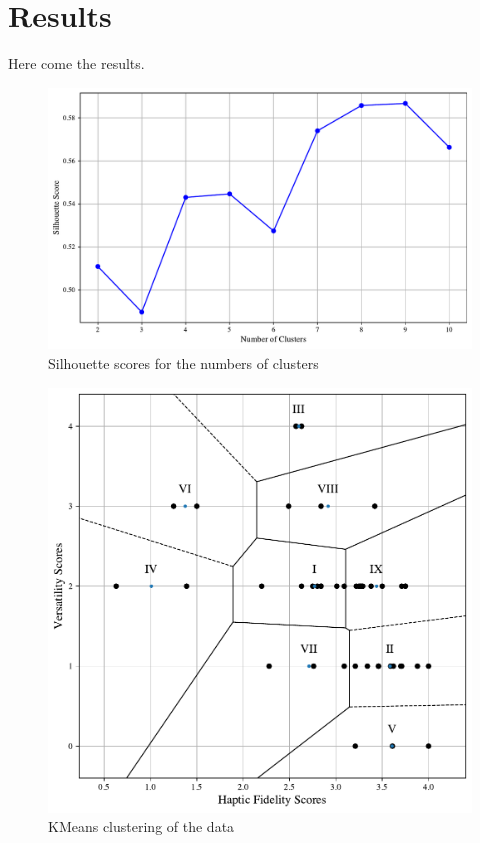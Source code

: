 \twocolumn

\section{Results}
Here come the results.



\begin{figure}[]
    \centering
    \includegraphics[width=\columnwidth]{figures/silhouette.pdf} 
    \caption{Silhouette scores for the numbers of clusters}
    \label{fig:silhouette}
\end{figure}

\begin{figure}[]
    \centering
    \includegraphics[width=\columnwidth]{figures/literature_data.pdf} 
    \caption{KMeans clustering of the data}
    \label{fig:kmeans}
\end{figure}




